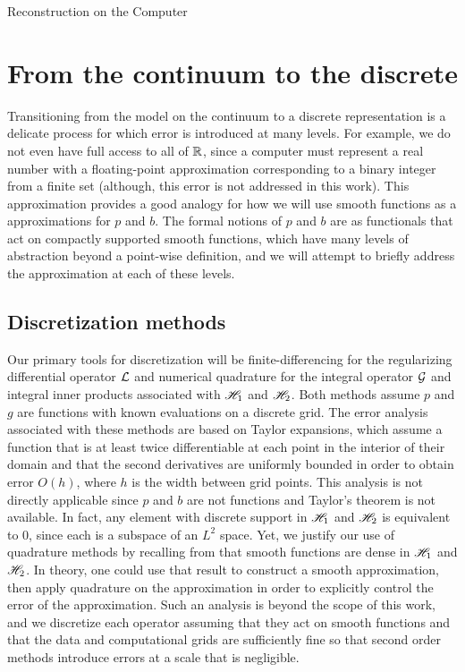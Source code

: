 \begin{chapter}{Reconstruction on the Computer}
\section{From the continuum to the discrete} \label{sec:discretization}

Transitioning from the model on the continuum to a discrete representation is a delicate process for which error is introduced at many levels.  
For example, we do not even have full access to all of $\mathbb R$, since a computer must represent a real number with a floating-point approximation corresponding to a binary integer from a finite set (although, this error is not addressed in this work). 
This approximation provides a good analogy for how we will use smooth functions as a approximations for $p$ and $b$.
The formal notions of $p$ and $b$ are as functionals that act on compactly supported smooth functions, which have many levels of abstraction beyond a point-wise definition, and we will attempt to briefly address the approximation at each of these levels.

\subsection{Discretization methods}
Our primary tools for discretization will be finite-differencing for the regularizing differential operator $\mathcal L$ and numerical quadrature for the integral operator $\mathcal G$ and integral inner products associated with $\mathscr H_1$ and $\mathscr H_2$.
Both methods assume $p$ and $g$ are functions with known evaluations on a discrete grid.
The error analysis associated with these methods are based on Taylor expansions, which assume a function that is at least twice differentiable at each point in the interior of their domain and that the second derivatives are uniformly bounded in order to obtain error $O(h)$, where $h$ is the width between grid points.
This analysis is not directly applicable since $p$ and $b$ are not functions and Taylor's theorem is not available.
In fact, any element with discrete support in $\mathscr H_1$ and $\mathscr H_2$ is equivalent to $0$, since each is a subspace of an $L^2$ space.
Yet, we justify our use of quadrature methods by recalling from  that smooth functions are dense in $\mathscr H_1$ and $\mathscr H_2$.
In theory, one could use that result to construct a smooth approximation, then apply quadrature on the approximation in order to explicitly control the error of the approximation.
Such an analysis is beyond the scope of this work, and we discretize each operator assuming that they act on smooth functions and that the data and computational grids are sufficiently fine so that second order methods introduce errors at a scale that is negligible.


\end{chapter}
